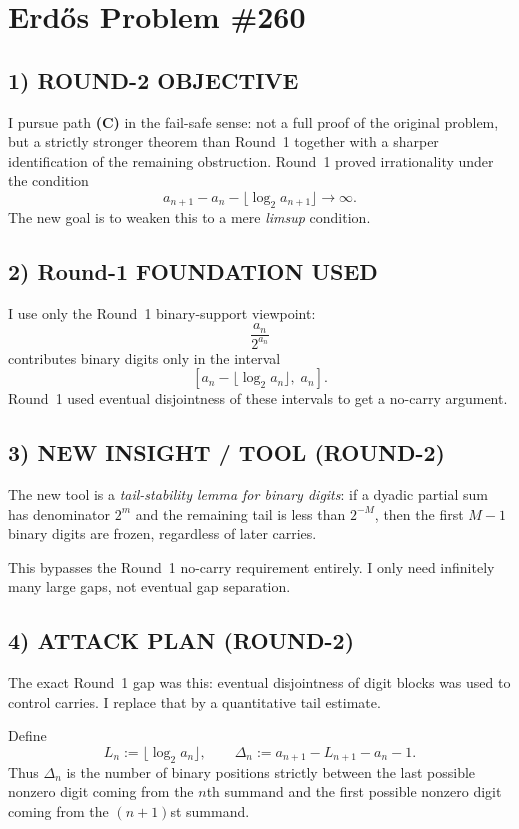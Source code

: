 
\section{Erd\H{o}s Problem \#260}

\subsection*{1) ROUND-2 OBJECTIVE}

I pursue path \textbf{(C)} in the fail-safe sense: not a full proof of the original problem, but a strictly stronger theorem than Round~1 together with a sharper identification of the remaining obstruction.  Round~1 proved irrationality under the condition
\[
a_{n+1}-a_n-\lfloor \log_2 a_{n+1}\rfloor \longrightarrow \infty.
\]
The new goal is to weaken this to a mere \emph{limsup} condition.

\subsection*{2) Round-1 FOUNDATION USED}

I use only the Round~1 binary-support viewpoint:
\[
\frac{a_n}{2^{a_n}}
\]
contributes binary digits only in the interval
\[
[a_n-\lfloor \log_2 a_n\rfloor,\; a_n].
\]
Round~1 used eventual disjointness of these intervals to get a no-carry argument.

\subsection*{3) NEW INSIGHT / TOOL (ROUND-2)}

The new tool is a \emph{tail-stability lemma for binary digits}: if a dyadic partial sum has denominator $2^m$ and the remaining tail is less than $2^{-M}$, then the first $M-1$ binary digits are frozen, regardless of later carries.

This bypasses the Round~1 no-carry requirement entirely.  I only need infinitely many large gaps, not eventual gap separation.

\subsection*{4) ATTACK PLAN (ROUND-2)}

The exact Round~1 gap was this: eventual disjointness of digit blocks was used to control carries.  I replace that by a quantitative tail estimate.

Define
\[
L_n:=\lfloor \log_2 a_n\rfloor,\qquad
\Delta_n:=a_{n+1}-L_{n+1}-a_n-1.
\]
Thus $\Delta_n$ is the number of binary positions strictly between the last possible nonzero digit coming from the $n$th summand and the first possible nonzero digit coming from the $(n+1)$st summand.

